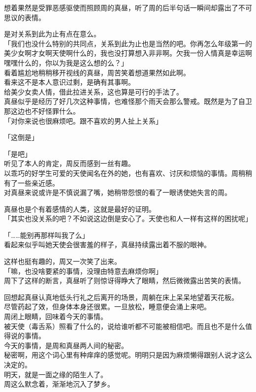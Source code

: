 想着果然是受罪恶感驱使而照顾周的真昼，听了周的后半句话一瞬间却露出了不可思议的表情。

是对关系到此为止有点在意么。\\

「我们也没什么特别的共同点，关系到此为止也是当然的吧。你再怎么年级第一的美少女啊才女啊天使啊什么的，我也没打算想入非非啊。欠我一份人情真是幸运啊嘿嘿什么的，你以为我是这么想的么？」\\

看着尴尬地稍稍移开视线的真昼，周苦笑着想道果然如此啊。\\

看来这不是本人意识过剩，是确有其事啊。\\

给美少女卖人情，借此拉进关系，这也算是可行的手法了。\\

真昼似乎是经历了好几次这种事情，也难怪那个雨天会那么警戒。既然是为了自卫那这边也不好怪罪什么。\\

「对你来说也很麻烦吧。跟不喜欢的男人扯上关系」

「这倒是」

「是吧」\\

听见了本人的肯定，周反而感到一丝有趣。\\

以乖巧的好学生可爱的天使闻名在外的她，也有喜欢、讨厌和烦恼的事情。周稍稍有了一些亲近感。\\

对真昼来说或许是不慎说漏了嘴，她稍带怨恨的看了一眼诱使她失言的周。

真昼也是个有着感情的人类，这就是最好的证明。\\

「其实也没关系的吧？不如说这边倒是安心了。天使也和人一样有这样的困扰呢」

「……能别再那样叫我了么」\\

看起来似乎叫她天使会很害羞的样子，真昼持续露出着不服的眼神。

这样也挺有趣的，周又一次笑了出来。\\

「嘛，也没啥要紧的事情，没理由特意去麻烦你啊」\\

周下了这样的断言，真昼听了则惊讶得睁大了眼睛，然后微微露出苦笑的表情。\\

\vspace{2\baselineskip}

回想起真昼认真地低头行礼之后离开的场景，周躺在床上呆呆地望着天花板。\\

尽管药起了效，但身体本身还很累。一旦放松，睡意便会涌上来吧。\\

周闭上眼睛，回味着今天的事情。\\

被天使（毒舌系）照看了什么的，说给谁听都不可能被相信吧。而且也不是什么值得说的事情。\\

今天的事情，是周和真昼两人间的秘密。\\

秘密啊，用这个词心里有种痒痒的感觉呢。明明只是因为麻烦懒得跟别人说才这么决定的。\\

明天，就是一面之缘的陌生人了。\\

周这么默念着，渐渐地沉入了梦乡。
